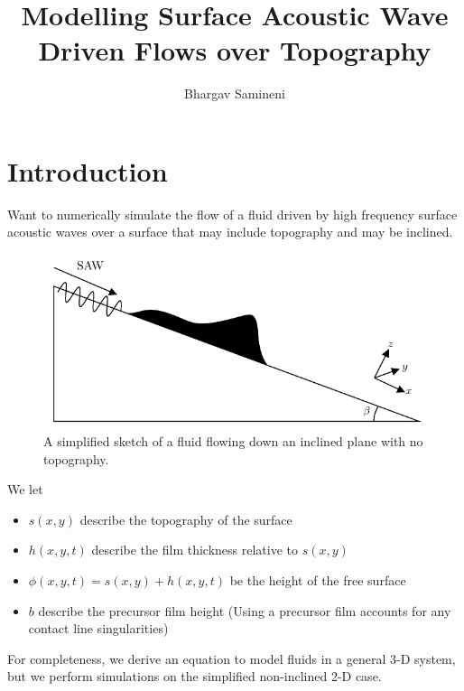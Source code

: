 \documentclass[compress, xcolor=dvipsnames]{beamer}
\title{Modelling Surface Acoustic Wave Driven Flows over Topography}
\author{Bhargav Samineni}
\newcommand{\func}[2]{\ensuremath{#1\!\lrp{#2}}}
\newcommand{\lrp}[1]{\left( #1 \right)}
\begin{document}
   
    \frame{\titlepage}     

    \section{Introduction}
    \begin{frame}
        Want to numerically simulate the flow of a fluid driven by 
        high frequency surface acoustic waves over a surface that may include topography
        and may be inclined. 

        \begin{figure}[hb]
            \centering
            \includegraphics[width=.75\textwidth]{images/samp_diagram.pdf}
            \caption{A simplified sketch of a fluid flowing down an inclined plane with no topography.}
            \label{fig:model_diagram}
        \end{figure}
    \end{frame}
    \begin{frame} 
        We let
        \begin{itemize}
            \item $\func{s}{x, y}$ describe the topography of the surface
            \item $\func{h}{x,y,t}$ describe the film thickness relative to $\func{s}{x,y}$ 
            \item $\func{\phi}{x,y,t} = \func{s}{x,y} + \func{h}{x,y,t}$ be the height of the free surface
            \item $b$ describe the precursor film height (Using a precursor film accounts for any contact line singularities)
        \end{itemize}

        For completeness, we derive an equation to model fluids in a general
        3-D system, but we perform simulations on the simplified non-inclined 2-D case. 
    \end{frame}

    
    
    
\end{document}
